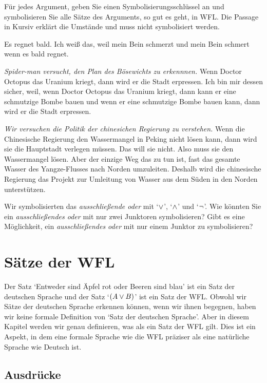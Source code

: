 \problempart
Für jedes Argument, geben Sie einen Symbolisierungsschlüssel an und symbolisieren Sie alle Sätze des Arguments, so gut es geht, in WFL. Die Passage in Kursiv erklärt die Umstände und muss nicht symbolisiert werden.
\begin{earg}
\item Es regnet bald. Ich wei{\ss} das, weil mein Bein schmerzt und mein Bein schmert wenn es bald regnet.

\item  \emph{Spider-man versucht, den Plan des Bösewichts zu erkennnen.} Wenn Doctor Octopus das Uranium kriegt, dann wird er die Stadt erpressen. Ich bin mir dessen sicher, weil, wenn Doctor Octopus das Uranium kriegt, dann kann er eine schmutzige Bombe bauen und wenn er eine schmutzige Bombe bauen kann, dann wird er die Stadt erpressen.

\item \emph{Wir versuchen die Politik der chinesichen Regierung zu verstehen.} Wenn die Chinesische Regierung den Wassermangel in Peking nicht lösen kann, dann wird sie die Hauptstadt verlegen müssen. Das will sie nicht. Also muss sie den Wassermangel lösen. Aber der einzige Weg das zu tun ist, fast das gesamte Wasser des Yangze-Flusses nach Norden umzuleiten. Deshalb wird die chinesische Regierung das Projekt zur Umleitung von Wasser aus dem Süden in den Norden unterstützen.       
\end{earg}

\problempart
Wir symbolisierten das \emph{ausschlie{\ss}ende oder} mit `$\vee$', `$\wedge$' und `$\neg$'. Wie könnten Sie ein \emph{ausschlie{\ss}endes oder} mit nur zwei Junktoren symbolisieren? Gibt es eine Möglichkeit, ein \emph{ausschlie{\ss}endes oder} mit nur einem Junktor zu symbolisieren?

\chapter{Sätze der WFL}\label{s:TFLSentences}
Der Satz `Entweder sind Äpfel rot oder Beeren sind blau' ist ein Satz der deutschen Sprache und der Satz `$(A \vee B)$' ist ein Satz der WFL. Obwohl wir Sätze der deutschen Sprache erkennen können, wenn wir ihnen begegnen, haben wir keine formale Definition von `Satz der deutschen Sprache'. Aber in diesem Kapitel werden wir genau definieren, was als ein Satz der WFL gilt. Dies ist ein Aspekt, in dem eine formale Sprache wie die WFL präziser als eine natürliche Sprache wie Deutsch ist.

\section{Ausdrücke}

